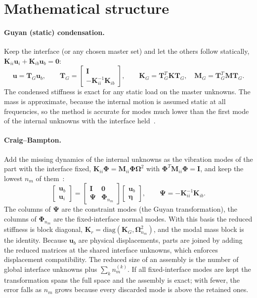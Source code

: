 \section{Mathematical structure}\label{sec:cm-math}

\paragraph{Guyan (static) condensation.}
Keep the interface (or any chosen master set) and let the others follow statically, $\bm K_{ii}\bm u_i+\bm K_{ib}\bm u_b=\bm 0$:
\begin{equation}\label{eq:cm-guyan}
\bm u=\bm T_G\bm u_b,\qquad \bm T_G=\begin{bmatrix}\bm I\\-\bm K_{ii}^{-1}\bm K_{ib}\end{bmatrix},\qquad \bm K_G=\bm T_G^T\bm K\bm T_G,\quad \bm M_G=\bm T_G^T\bm M\bm T_G .
\end{equation}
The condensed stiffness is exact for any static load on the master unknowns. The mass is approximate, because the internal motion is assumed static at all frequencies, so the method is accurate for modes much lower than the first mode of the internal unknowns with the interface held~\cite{guyan1965}.

\paragraph{Craig--Bampton.}
Add the missing dynamics of the internal unknowns as the vibration modes of the part with the interface fixed, $\bm K_{ii}\bm\Phi=\bm M_{ii}\bm\Phi\bm\Omega^2$ with $\bm\Phi^T\bm M_{ii}\bm\Phi=\bm I$, and keep the lowest $n_m$ of them~\cite{hurty1965,craig1968}:
\begin{equation}\label{eq:cm-cb}
\begin{bmatrix}\bm u_b\\\bm u_i\end{bmatrix}=\begin{bmatrix}\bm I&\bm 0\\\bm\Psi&\bm\Phi_{n_m}\end{bmatrix}\begin{bmatrix}\bm u_b\\\bm\eta\end{bmatrix},\qquad \bm\Psi=-\bm K_{ii}^{-1}\bm K_{ib}.
\end{equation}
The columns of $\bm\Psi$ are the constraint modes (the Guyan transformation), the columns of $\bm\Phi_{n_m}$ are the fixed-interface normal modes. With this basis the reduced stiffness is block diagonal, $\bm K_r=\mathrm{diag}(\bm K_G,\bm\Omega^2_{n_m})$, and the modal mass block is the identity. Because $\bm u_b$ are physical displacements, parts are joined by adding the reduced matrices at the shared interface unknowns, which enforces displacement compatibility. The reduced size of an assembly is the number of global interface unknowns plus $\sum_k n_m^{(k)}$. If all fixed-interface modes are kept the transformation spans the full space and the assembly is exact; with fewer, the error falls as $n_m$ grows because every discarded mode is above the retained ones.

